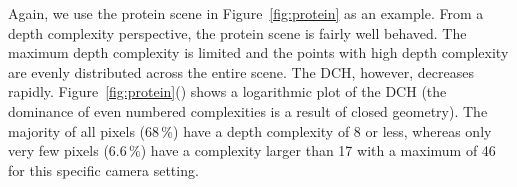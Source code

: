 \documentclass{egpubl}
\newcommand{\dch}{DCH}
\begin{document}

Again, we use the protein scene in Figure~\ref{fig:protein} as an example. 
From a depth complexity perspective, the protein scene is fairly well behaved.
The maximum depth complexity is limited and the points with high depth complexity are evenly distributed across the entire scene. 
The \dch{}, however, decreases rapidly.
Figure~\ref{fig:protein}() shows a logarithmic plot of the \dch{} (the dominance of even numbered complexities is a result of closed geometry).
The majority of all pixels ($68\,\%$) have a depth complexity of 8 or less, whereas only very few pixels ($6.6\,\%$) have a complexity larger than 17 with a maximum of 46 for this specific camera setting. 
\end{document}
